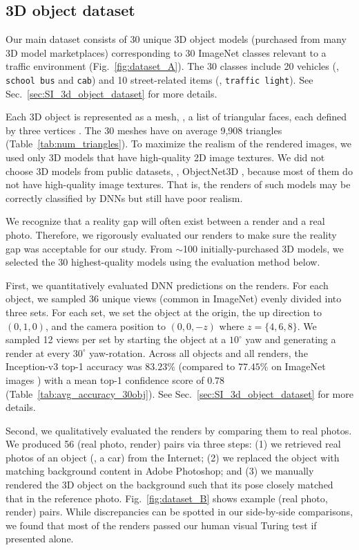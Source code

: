\documentclass[10pt,twocolumn,letterpaper]{article}
\newcommand{\subsec}[1]{\noindent{\textbf{#1.}}}
\newcommand{\class}[1]{{\small\texttt{#1}}}
\begin{document}
\subsection{3D object dataset}
\label{sec:3d_object_dataset}

\subsec{Construction}
Our main dataset consists of 30 unique 3D object models (purchased from many 3D model marketplaces) corresponding to 30 ImageNet classes relevant to a traffic environment (Fig.~\ref{fig:dataset_A}).
The 30 classes include 20 vehicles (\eg, \class{school bus} and \class{cab}) and 10 street-related items (\eg, \class{traffic light}). See Sec.~\ref{sec:SI_3d_object_dataset} for more details.

Each 3D object is represented as a mesh, \ie, a list of triangular faces, each defined by three vertices \cite{marschner2015fundamentals}.
The 30 meshes have on average 9,908 triangles (Table~\ref{tab:num_triangles}).
To maximize the realism of the rendered images, we used only 3D models that have high-quality 2D image textures.
We did not choose 3D models from public datasets, \eg, ObjectNet3D \cite{xiang2016objectnet3d}, because most of them do not have high-quality image textures.
That is, the renders of such models may be correctly classified by DNNs but still have poor realism.

\subsec{Evaluation}
We recognize that a reality gap will often exist between a render and a real photo.
Therefore, we rigorously evaluated our renders to make sure the reality gap was acceptable for our study.
From $\sim$100 initially-purchased 3D models, we selected the 30 highest-quality models using the evaluation method below.

First, we quantitatively evaluated DNN predictions on the renders.
For each object, we sampled 36 unique views (common in ImageNet) evenly divided into three sets.
For each set, we set the object at the origin, the up direction to $(0,1,0)$, and the camera position to $(0,0,-z)$ where $z = \{4, 6, 8\}$.
We sampled 12 views per set by starting the object at a $10^\circ{}$ yaw and generating a render at every $30^\circ{}$ yaw-rotation.
Across all objects and all renders, the Inception-v3 top-1 accuracy was $83.23\%$ (compared to $77.45\%$ on ImageNet images \cite{szegedy2016rethinking}) with a mean top-1 confidence score of $0.78$ (Table~\ref{tab:avg_accuracy_30obj}).
See Sec.~\ref{sec:SI_3d_object_dataset} for more details.

Second, we qualitatively evaluated the renders by comparing them to real photos.
We produced 56 (real photo, render) pairs via three steps: (1) we retrieved real photos of an object (\eg, a car) from the Internet; (2) we replaced the object with matching background content in Adobe Photoshop; and (3) we manually rendered the 3D object on the background such that its pose closely matched that in the reference photo.
Fig.~\ref{fig:dataset_B} shows example (real photo, render) pairs.
While discrepancies can be spotted in our side-by-side comparisons, we found that most of the renders passed our human visual Turing test if presented alone.
\end{document}
